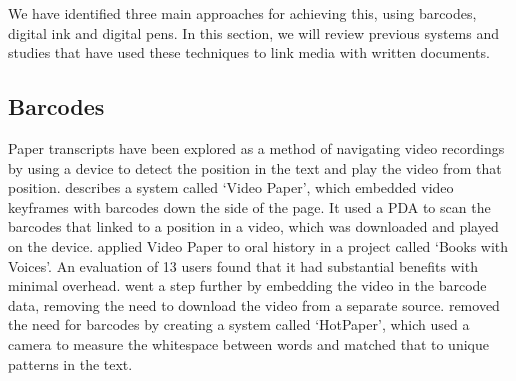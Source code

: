 We have identified three main approaches for achieving this, using barcodes, digital ink and digital pens.
In this section, we will review previous systems and studies that have used these techniques to link media with written
documents.


\subsection{Barcodes}
Paper transcripts have been explored as a method of navigating video recordings by using a device to detect the
position in the text and play the video from that position. \citet{Hull2003} describes a system called `Video Paper',
which embedded video keyframes with barcodes down the side of the page. It used a PDA to scan the barcodes that linked
to a position in a video, which was downloaded and played on the device. \citet{Klemmer2003} applied Video Paper to
oral history in a project called `Books with Voices'. An evaluation of 13 users found that it had substantial benefits
with minimal overhead.  \citet{Erol2007} went a step further by embedding the video in the barcode data, removing the
need to download the video from a separate source. \citet{Erol2008} removed the need for barcodes by creating a system
called `HotPaper', which used a camera to measure the whitespace between words and matched that to unique patterns in
the text.

